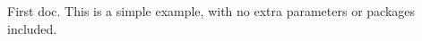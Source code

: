 \documentclass{article}
\begin{document}
First doc. This is a simple example, with no
extra parameters or packages included.
\end{document}
